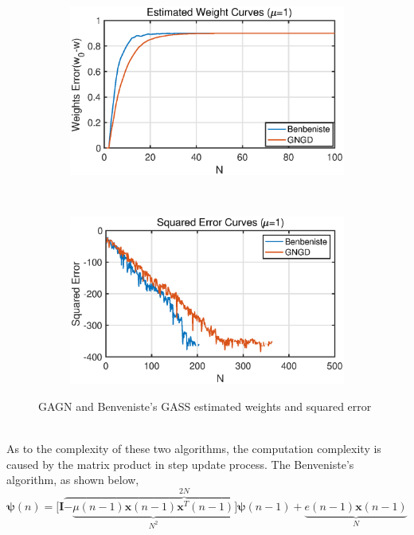 \begin{figure}[htbp]
\begin{subfigure}[b]{0.4\textwidth}
     \end{subfigure}
     ~   
      \begin{subfigure}[b]{0.4\textwidth}
         \centering
         \includegraphics[width=\textwidth]{fig/22/22c3.eps}
     \end{subfigure}
     ~
     \begin{subfigure}[b]{0.4\textwidth}
         \centering
         \includegraphics[width=\textwidth]{fig/22/22c4.eps}
     \end{subfigure}
        \caption{GAGN and Benveniste's GASS estimated weights and squared error}
        \label{fig:2_2_c}
\end{figure}\\
As to the complexity of these two algorithms, the computation complexity is caused by the matrix product in step update process. The Benveniste's algorithm, as shown below,
\begin{equation}
	\mathbf{\psi}(n)=[\mathbf I\overbrace{-\underbrace{\mu(n-1)\mathbf x(n-1)\mathbf {x}^T(n-1)}_{N^2}]\mathbf{\psi}(n-1)+}^{2N}\underbrace{e(n-1)\mathbf x(n-1)}_{N}
\end{equation}
